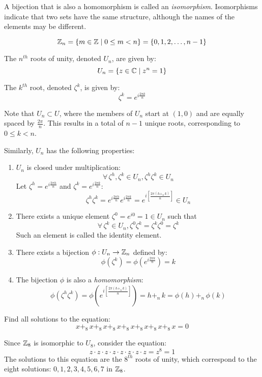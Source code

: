\documentclass[letterpaper,12pt,fleqn]{article}
\newcommand{\z}{\zeta}
\begin{document}
A bijection that is also a homomorphism is called an \emph{isomorphism}.
Isomorphisms indicate that two sets have the same structure, although the names
of the elements may be different.

\begin{definition}
  \listbreak
  \[\mathbb{Z}_n=\{m\in\mathbb{Z}\mid0\le m<n\}=\{0,1,2,\ldots,n-1\}\]
\end{definition}

\begin{definition}
  The $n^{th}$ roots of unity, denoted $U_n$, are given by:
  \[U_n=\{z\in\mathbb{C}\mid z^n=1\}\]

  The $k^{th}$ root, denoted $\z^k$, is given by:
  \[\z^k=e^{i\frac{2\pi k}{n}}\]
\end{definition}

Note that $U_n\subset U$, where the members of $U_n$ start at $(1,0)$ and are
equally spaced by $\frac{2\pi}{n}$. This results in a total of $n-1$ unique
roots, corresponding to $0\le k<n$.

Similarly, $U_n$ has the following properties:
\begin{enumerate}
\item $U_n$ is closed under multiplication:
  \[\forall\,\z^h,\z^k\in U_n, \z^h\z^k\in U_n\]
  Let $\z^h=e^{i\frac{2\pi h}{n}}$ and $\z^k=e^{i\frac{2\pi k}{n}}$:
  \[\z^h\z^k=e^{i\frac{2\pi h}{n}}e^{i\frac{2\pi k}{n}}=
      e^{i\left[\frac{2\pi(h+_n\,k)}{n}\right]}\in U_n\]

\item There exists a unique element $\z^0=e^{i0}=1\in U_n$ such that
  \[\forall\,\z^k\in U_n,\z^0\z^k=\z^k\z^0=\z^k\]
  Such an element is called the identity element.

\item There exists a bijection $\phi:U_n\to\mathbb{Z}_n$ defined by:
  \[\phi(\z^k)=\phi(e^{i\frac{2\pi k}{n}})=k\]

\item The bijection $\phi$ is also a \emph{homomorphism}:
  \[\phi(\z^h\z^k)=\phi\left(e^{i\left[\frac{2\pi(h+_n\,k)}{n}\right]}\right)=
  h+_n\,k=\phi(h)+_n\,\phi(k)\]
\end{enumerate}

\begin{example}
  Find all solutions to the equation:
  \[x+_8\,x+_8\,x+_8\,x+_8\,x+_8\,x+_8\,x+_8\,x=0\]

  Since $\mathbb{Z}_8$ is isomorphic to $U_8$, consider the equation:
  \[z\cdot z\cdot z\cdot z\cdot z\cdot z\cdot z\cdot z=z^8=1\]
  The solutions to this equation are the $8^{th}$ roots of unity, which
  correspond to the eight solutions: $0,1,2,3,4,5,6,7$ in $\mathbb{Z}_8$.
\end{example}
\end{document}
